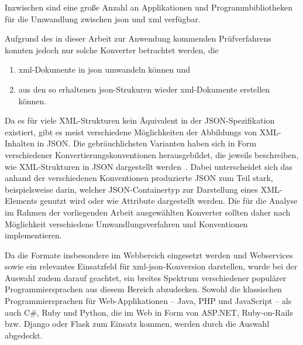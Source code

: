 Inzwischen sind eine große Anzahl an Applikationen und Programmbibliotheken für die Umwandlung zwischen \acrshort{json} und \acrshort{xml} verfügbar.

\begin{samepage}
Aufgrund des in dieser Arbeit zur Anwendung kommenden Prüfverfahrens konnten jedoch nur solche Konverter betrachtet werden, die
\begin{enumerate}
    \item{} \acrshort{xml}-Dokumente in \acrshort{json} umwandeln können und
    \item{} aus den so erhaltenen \acrshort{json}-Strukuren wieder \acrshort{xml}-Dokumente erstellen können.
\end{enumerate}
\end{samepage}

Da es für viele XML-Strukturen kein Äquivalent in der JSON-Spezifikation existiert, gibt es meist verschiedene Möglichkeiten der Abbildungs von XML-Inhalten in JSON.
Die gebräuchlichsten Varianten haben sich in Form verschiedener Konvertierungskonventionen herausgebildet, die jeweils beschreiben, wie XML-Strukturen in JSON dargestellt werden~\cite{open311-conventions}. Dabei unterscheidet sich das anhand der verschiedenen Konventionen produzierte JSON zum Teil stark, beispielsweise darin, welcher JSON-Container\-typ zur Darstellung eines XML-Elements genutzt wird oder wie Attribute dargestellt werden. Die für die Analyse im Rahmen der vorliegenden Arbeit ausgewählten Konverter sollten daher nach Möglichkeit verschiedene Umwandlungsverfahren und Konventionen implementieren.

Da die Formate insbesondere im Webbereich eingesetzt werden und Webservices sowie  ein relevantes Einsatzfeld für \acrshort{xml}-\acrshort{json}-Konversion darstellen, wurde bei der Auswahl zudem darauf geachtet, ein breites Spektrum verschiedener populärer Programmiersprachen aus diesem Bereich abzudecken. Sowohl die klassischen Programmiersprachen für Web-Applikationen --  Java, PHP und JavaScript -- als auch C\#, Ruby und Python, die im Web in Form von ASP.NET, Ruby-on-Rails bzw. Django oder Flask zum Einsatz kommen, werden durch die Auswahl abgedeckt.

